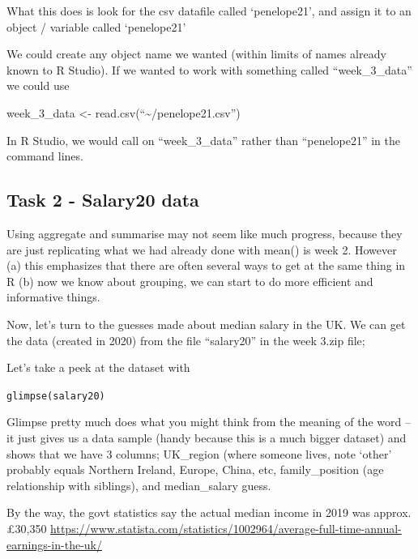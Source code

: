 \documentclass[
]{book}
\begin{document}
What this does is look for the csv datafile called `penelope21', and assign it to an object / variable called `penelope21'

We could create any object name we wanted (within limits of names already known to R Studio). If we wanted to work with something called ``week\_3\_data'' we could use

week\_3\_data \textless- read.csv(``\textasciitilde/penelope21.csv'')

In R Studio, we would call on ``week\_3\_data'' rather than ``penelope21'' in the command lines.

\hypertarget{task-2---salary20-data}{%
\subsection{Task 2 - Salary20 data}\label{task-2---salary20-data}}

Using aggregate and summarise may not seem like much progress, because they are just replicating what we had already done with mean() is week 2. However (a) this emphasizes that there are often several ways to get at the same thing in R (b) now we know about grouping, we can start to do more efficient and informative things.

Now, let's turn to the guesses made about median salary in the UK. We can get the data (created in 2020) from the file ``salary20'' in the week 3.zip file;

Let's take a peek at the dataset with

\texttt{glimpse(salary20)}

Glimpse pretty much does what you might think from the meaning of the word -- it just gives us a data sample (handy because this is a much bigger dataset) and shows that we have 3 columns; UK\_region (where someone lives, note `other' probably equals Northern Ireland, Europe, China, etc, family\_position (age relationship with siblings), and median\_salary guess.

By the way, the govt statistics say the actual median income in 2019 was approx. £30,350 \url{https://www.statista.com/statistics/1002964/average-full-time-annual-earnings-in-the-uk/}
\end{document}
